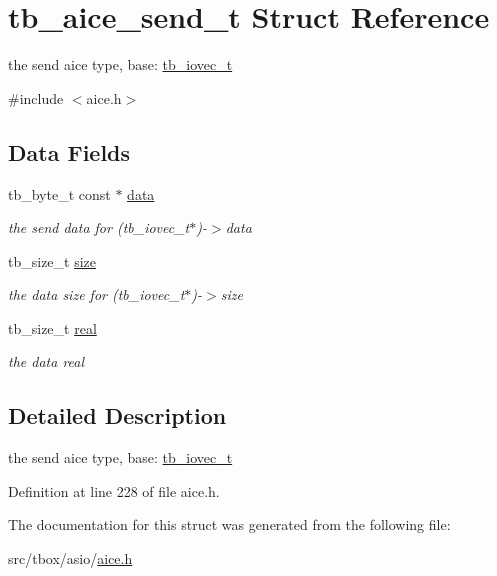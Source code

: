 \hypertarget{structtb__aice__send__t}{\section{tb\-\_\-aice\-\_\-send\-\_\-t Struct Reference}
\label{structtb__aice__send__t}
}


the send aice type, base\-: \hyperlink{structtb__iovec__t}{tb\-\_\-iovec\-\_\-t}  




{\ttfamily \#include $<$aice.\-h$>$}

\subsection*{Data Fields}
\begin{DoxyCompactItemize}
\item 
\hypertarget{structtb__aice__send__t_a64bb1891f4043d4dd3323e50efcab8f4}{tb\-\_\-byte\-\_\-t const $\ast$ \hyperlink{structtb__aice__send__t_a64bb1891f4043d4dd3323e50efcab8f4}{data}}\label{structtb__aice__send__t_a64bb1891f4043d4dd3323e50efcab8f4}

\begin{DoxyCompactList}\small\item\em the send data for (tb\-\_\-iovec\-\_\-t$\ast$)-\/$>$data \end{DoxyCompactList}\item 
\hypertarget{structtb__aice__send__t_a2ce3a01062902e2db608a44bf0b6a2a2}{tb\-\_\-size\-\_\-t \hyperlink{structtb__aice__send__t_a2ce3a01062902e2db608a44bf0b6a2a2}{size}}\label{structtb__aice__send__t_a2ce3a01062902e2db608a44bf0b6a2a2}

\begin{DoxyCompactList}\small\item\em the data size for (tb\-\_\-iovec\-\_\-t$\ast$)-\/$>$size \end{DoxyCompactList}\item 
\hypertarget{structtb__aice__send__t_a3e2f929ee9f0ac21e4dc7840af75cdfb}{tb\-\_\-size\-\_\-t \hyperlink{structtb__aice__send__t_a3e2f929ee9f0ac21e4dc7840af75cdfb}{real}}\label{structtb__aice__send__t_a3e2f929ee9f0ac21e4dc7840af75cdfb}

\begin{DoxyCompactList}\small\item\em the data real \end{DoxyCompactList}\end{DoxyCompactItemize}


\subsection{Detailed Description}
the send aice type, base\-: \hyperlink{structtb__iovec__t}{tb\-\_\-iovec\-\_\-t} 

Definition at line 228 of file aice.\-h.



The documentation for this struct was generated from the following file\-:\begin{DoxyCompactItemize}
\item 
src/tbox/asio/\hyperlink{aice_8h}{aice.\-h}\end{DoxyCompactItemize}
